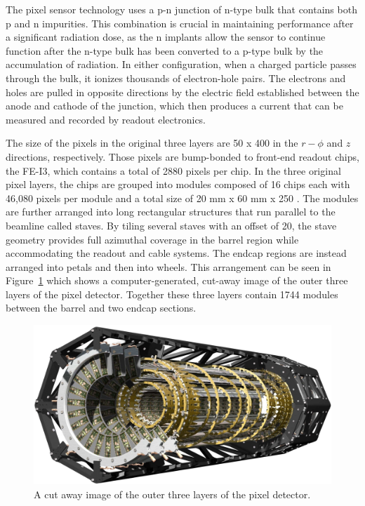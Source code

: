 The pixel sensor technology uses a p-n junction of n-type bulk that contains both p\tsup{+} and n\tsup{+} impurities.
This combination is crucial in maintaining performance after a significant radiation dose, as the n\tsup{+} implants allow the sensor to continue function after the n-type bulk has been converted to a p-type bulk by the accumulation of radiation.
In either configuration, when a charged particle passes through the bulk, it ionizes thousands of electron-hole pairs. 
The electrons and holes are pulled in opposite directions by the electric field established between the anode and cathode of the junction, which then produces a current that can be measured and recorded by readout electronics.

The size of the pixels in the original three layers are 50 \um x 400 \um in the $r-\phi$ and $z$ directions, respectively.
Those pixels are bump-bonded to front-end readout chips, the FE-I3, which contains a total of 2880 pixels per chip. 
In the three original pixel layers, the chips are grouped into modules composed of 16 chips each with 46,080 pixels per module and a total size of 20 mm x 60 mm x 250 \um. 
The modules are further arranged into long rectangular structures that run parallel to the beamline called staves.
By tiling several staves with an offset of 20\textdegree, the stave geometry provides full azimuthal coverage in the barrel region while accommodating the readout and cable systems.
The endcap regions are instead arranged into petals and then into wheels. 
This arrangement can be seen in Figure~\ref{fig:pixel_overview} which shows a computer-generated, cut-away image of the outer three layers of the pixel detector.
Together these three layers contain 1744 modules between the barrel and two endcap sections.

\begin{figure}[hbtp]
\includegraphics[width=\fullfig]{figures/pixel_overview.pdf}
\caption{A cut away image of the outer three layers of the pixel detector.}
\label{fig:pixel_overview}
\end{figure}

